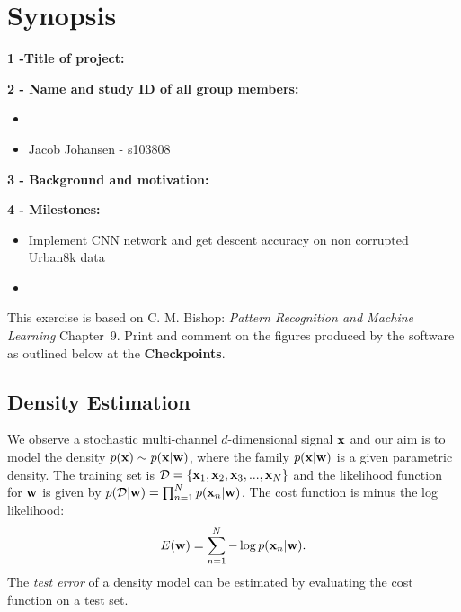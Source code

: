 \documentclass[times,12pt]{article}    %
\def\xb{{\bf x}}
\def\wb{{\bf w}}
\begin{document}
\section*{Synopsis}

\noindent \textbf{1 -Title of project:}
\noindent 

\noindent \textbf{2 - Name and study ID of all group members:}
\begin{itemize}
\item  
\item Jacob Johansen - s103808
\end{itemize}

\noindent \textbf{3 - Background and motivation:}

\noindent \textbf{4 - Milestones:}
\begin{itemize}
\item Implement CNN network and get descent accuracy on non corrupted Urban8k data
\item
\end{itemize}
This exercise is based on C. M. Bishop: {\em Pattern Recognition
and Machine Learning} Chapter~9. Print and comment on the figures
produced by the software as outlined below at the {\bf
Checkpoints}.

\subsection*{Density Estimation}

We observe a stochastic multi-channel $d$-dimensional signal $\xb$
and our aim is to model the density $p(\xb) \sim p(\xb|\wb)$, where
the family $p(\xb|\wb)$ is a given parametric density. The
training set is ${\cal D} = \{\xb_1,\xb_2,\xb_3,...,\xb_N\}$ and the
likelihood function for $\wb$ is given by $p({\cal D}|\wb) = \prod_{n=1}^{N}
p(\xb_n|\wb) $. The cost function is minus the log likelihood:
\begin{eqnarray}
E(\wb) = \sum_{n=1}^{N} - \log  p(\xb_n|\wb). \nonumber
\end{eqnarray}
The {\it test error} of a density model can be estimated by
evaluating the cost function on a test set.
\end{document}
